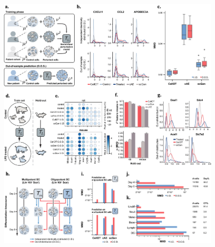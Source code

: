 \begin{figure}
    \centering
    \includegraphics[width=1.05\textwidth]{figures/fig_generalization_cellot.png}
 \end{figure}
